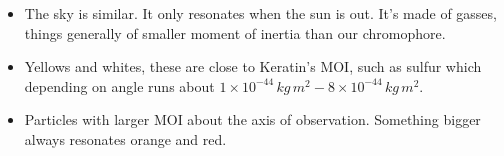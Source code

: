 \begin{itemize}[leftmargin=0.5cm]
    \item The sky is similar. It only resonates when the sun is out. It's made of gasses, things generally of smaller moment of inertia than our chromophore.
    \item Yellows and whites, these are close to Keratin's MOI, such as sulfur which depending on angle runs about $1\times10^{-44}\,\si{kg\,m^2} - 8\times10^{-44}\,\si{kg\,m^2}$.
    \item Particles with larger MOI about the axis of observation. Something bigger always resonates orange and red.
\end{itemize}
